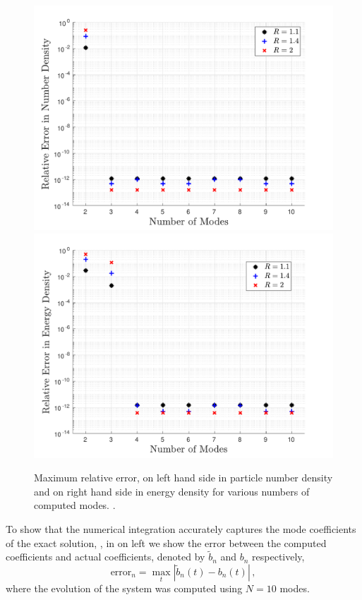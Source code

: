 \begin{figure}
\centerline{\includegraphics[width=0.5\linewidth]{plots/free_stream_num_err.pdf}\hspace*{-0.5cm}
\includegraphics[width=0.5\linewidth]{plots/free_stream_E_err.pdf}}
\caption{Maximum relative error, on left hand side in particle number density and on right hand side in energy density for various numbers of computed modes. .}\label{fig:freeStreamNumErr}
\end{figure}

 
To show that the numerical integration accurately captures the mode coefficients of the exact solution, , in  on left we show the error between the computed coefficients and actual coefficients, denoted by $\tilde b_n$ and $b_n$ respectively,
\begin{equation}\label{modeErrDef}
\text{error}_n=\max_{t} |\tilde{b}_n(t)-b_n(t)|\,,
\end{equation}
 where the evolution of the system was computed using $N=10$ modes.


